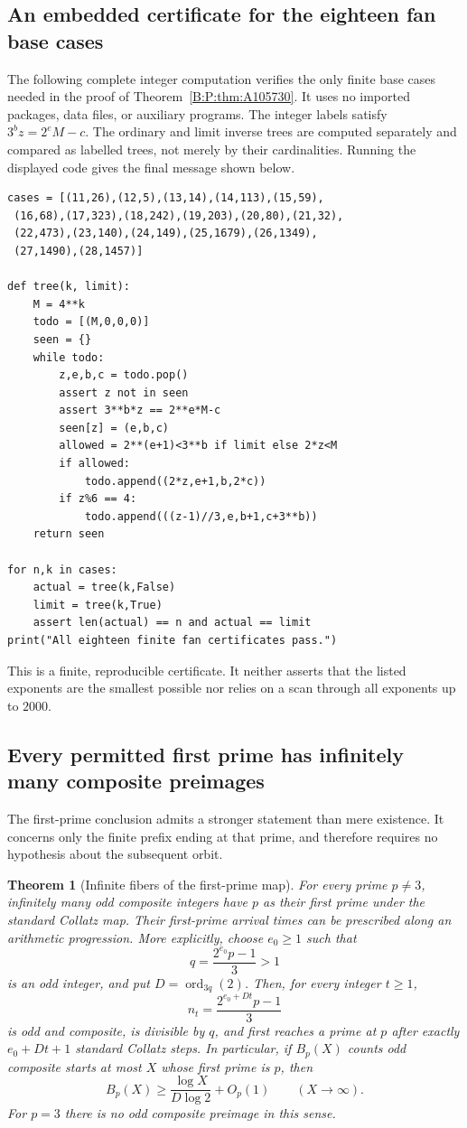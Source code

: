 \documentclass[11pt,a4paper]{article}
\newtheorem{theorem}{Theorem}[section]
\theoremstyle{definition}
\theoremstyle{remark}
\numberwithin{equation}{section}
\begin{document}
\subsection{An embedded certificate for the eighteen fan base cases}
The following complete integer computation verifies the only finite base
cases needed in the proof of Theorem~\ref{B:P:thm:A105730}. It uses no imported
packages, data files, or auxiliary programs. The integer labels satisfy
$3^b z=2^eM-c$. The ordinary and limit inverse trees are computed separately
and compared as labelled trees, not merely by their cardinalities. Running
the displayed code gives the final message shown below.
\begin{verbatim}
cases = [(11,26),(12,5),(13,14),(14,113),(15,59),
 (16,68),(17,323),(18,242),(19,203),(20,80),(21,32),
 (22,473),(23,140),(24,149),(25,1679),(26,1349),
 (27,1490),(28,1457)]

def tree(k, limit):
    M = 4**k
    todo = [(M,0,0,0)]
    seen = {}
    while todo:
        z,e,b,c = todo.pop()
        assert z not in seen
        assert 3**b*z == 2**e*M-c
        seen[z] = (e,b,c)
        allowed = 2**(e+1)<3**b if limit else 2*z<M
        if allowed:
            todo.append((2*z,e+1,b,2*c))
        if z%6 == 4:
            todo.append(((z-1)//3,e,b+1,c+3**b))
    return seen

for n,k in cases:
    actual = tree(k,False)
    limit = tree(k,True)
    assert len(actual) == n and actual == limit
print("All eighteen finite fan certificates pass.")
\end{verbatim}
This is a finite, reproducible certificate. It neither asserts that the
listed exponents are the smallest possible nor relies on a scan through
all exponents up to $2000$.

\subsection{Every permitted first prime has infinitely many composite preimages}
The first-prime conclusion admits a stronger statement than mere existence.
It concerns only the finite prefix ending at that prime, and therefore
requires no hypothesis about the subsequent orbit.

\begin{theorem}[Infinite fibers of the first-prime map]
\label{B:P:thm:infinite-first-prime}
For every prime $p\ne3$, infinitely many odd composite integers have $p$
as their first prime under the standard Collatz map. Their first-prime
arrival times can be prescribed along an arithmetic progression.
More explicitly, choose $e_0\ge1$ such that
\[
 q=\frac{2^{e_0}p-1}{3}>1
\]
is an odd integer, and put $D=\operatorname{ord}_{3q}(2)$. Then, for every
integer $t\ge1$,
\[
 n_t=\frac{2^{e_0+Dt}p-1}{3}
\]
is odd and composite, is divisible by $q$, and first reaches a prime at
$p$ after exactly $e_0+Dt+1$ standard Collatz steps. In particular, if
$B_p(X)$ counts odd composite starts at most $X$ whose first prime is $p$,
then
\[
 B_p(X)\ge\frac{\log X}{D\log2}+O_p(1)\qquad(X\longrightarrow\infty).
\]
For $p=3$ there is no odd composite preimage in this sense.
\end{theorem}
\end{document}
